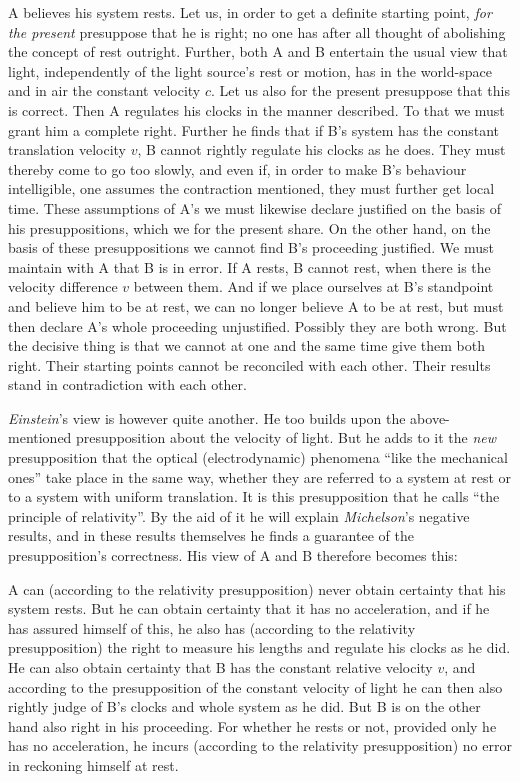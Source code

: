 \documentclass[12pt,a4paper]{article}
\begin{document}
A believes his system rests. Let us, in order to get a definite starting
point, \emph{for the present} presuppose that he is right; no one has after
all thought of abolishing the concept of rest outright. Further, both
A and B entertain the usual view that light, independently of the light
source's rest or motion, has in the world-space and in air the constant
velocity $c$. Let us also for the present presuppose that this is correct.
Then A regulates his clocks in the manner described. To that we must grant him
a complete right. Further he finds that if B's system has the constant
translation velocity $v$, B cannot rightly regulate his clocks as he does.
They must thereby come to go too slowly, and even if, in order to make B's
behaviour intelligible, one assumes the contraction mentioned, they must
further get local time. These assumptions of A's we must likewise declare
justified on the basis of his presuppositions, which we for the present share.
On the other hand, on the basis of these presuppositions we cannot find B's
proceeding justified. We must maintain with A that B is in error. If A rests,
B cannot rest, when there is the velocity difference $v$ between them. And if
we place ourselves at B's standpoint and believe him to be at rest, we can no
longer believe A to be at rest, but must then declare A's whole proceeding
unjustified. Possibly they are both wrong. But the decisive thing is that we
cannot at one and the same time give them both right. Their starting points
cannot be reconciled with each other. Their results stand in contradiction
with each other.

\emph{Einstein}'s view is however quite another. He too builds upon the
above-mentioned presupposition about the velocity of light. But he adds to it
the \emph{new} presupposition that the optical (electrodynamic) phenomena
``like the mechanical ones'' take place in the same way, whether they are
referred to a system at rest or to a system with uniform translation. It is
this presupposition that he calls ``the principle of relativity''. By the aid
of it he will explain \emph{Michelson}'s negative results, and in these
results themselves he finds a guarantee of the presupposition's correctness.
His view of A and B therefore becomes this:

A can (according to the relativity presupposition) never obtain certainty that
his system rests. But he can obtain certainty that it has no acceleration, and
if he has assured himself of this, he also has (according to the relativity
presupposition) the right to measure his lengths and regulate his clocks as he
did. He can also obtain certainty that B has the constant relative velocity
$v$, and according to the presupposition of the constant velocity of light he
can then also rightly judge of B's clocks and whole system as he did. But B is
on the
other hand also right in his proceeding. For whether he rests or not, provided
only he has no acceleration, he incurs (according to the relativity
presupposition) no error in reckoning himself at rest.
\end{document}
